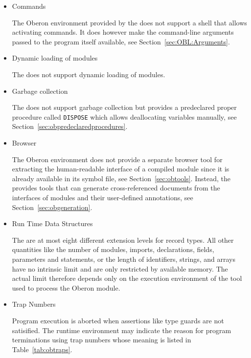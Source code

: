\begin{itemize}

\item Commands

The Oberon environment provided by the \ecs{} does not support a shell that allows activating commands.
It does however make the command-line arguments passed to the program itself available, see Section~\ref{sec:OBL:Arguments}.

\item Dynamic loading of modules

The \ecs{} does not support dynamic loading of modules.

\item Garbage collection

The \ecs{} does not support garbage collection but provides a predeclared proper procedure called \texttt{DISPOSE} which allows deallocating variables manually, see Section~\ref{sec:obpredeclaredprocedures}.

\item Browser

The Oberon environment does not provide a separate browser tool for extracting the human-readable interface of a compiled module since it is already available in its symbol file, see Section~\ref{sec:obtools}.
Instead, the \ecs{} provides tools that can generate cross-referenced documents from the interfaces of modules and their user-defined annotations, see Section~\ref{sec:obgeneration}.

\item Run Time Data Structures

The are at most eight different extension levels for record types.
All other quantities like the number of modules, imports, declarations, fields, parameters and statements, or the length of identifiers, strings, and arrays have no intrinsic limit and are only restricted by available memory.
The actual limit therefore depends only on the execution environment of the tool used to process the Oberon module.

\item Trap Numbers

Program execution is aborted when assertions like type guards are not satisified.
The runtime environment may indicate the reason for program terminations using trap numbers whose meaning is listed in Table~\ref{tab:obtraps}.


\end{itemize}

